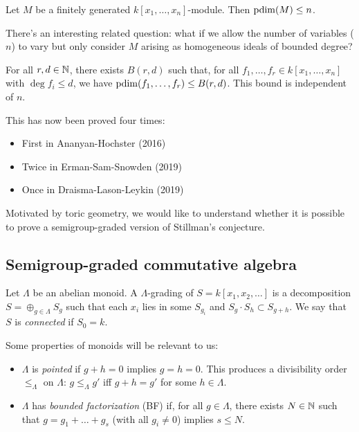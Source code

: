 \documentclass{article}
\begin{document}
\begin{thm}
	Let $M$ be a finitely generated $k[x_1, \dots, x_n]$-module.
	Then $\operatorname{pdim}(M) \leq n$.
\end{thm}

There's an interesting related question: what if we allow the number of variables ($n$) to vary but only consider $M$ arising as homogeneous ideals of bounded degree?

\begin{conj}
	For all $r, d \in \mathbb{N}$, there exists $B(r, d)$ such that, for all $f_1, \dots, f_r \in k[x_1, \dots, x_n]$ with $\deg f_i \leq d$, we have $\operatorname{pdim}(f_1, \dots, f_r) \leq B(r, d)$.
	This bound is independent of $n$.
\end{conj}

This has now been proved four times:
\begin{itemize}
	\item First in Ananyan-Hochster (2016)
	\item Twice in Erman-Sam-Snowden (2019)
	\item Once in Draisma-Lason-Leykin (2019)
\end{itemize}

Motivated by toric geometry, we would like to understand whether it is possible to prove a semigroup-graded version of Stillman's conjecture.

\subsection{Semigroup-graded commutative algebra}

Let $\Lambda$ be an abelian monoid.
A \emph{$\Lambda$}-grading of $S = k[x_1, x_2, \dots]$ is a decomposition $S = \oplus_{g \in \Lambda} S_g$ such that each $x_i$ lies in some $S_{g_i}$ and $S_g \cdot S_h \subset S_{g + h}$.
We say that $S$ is \emph{connected} if $S_0 = k$.

Some properties of monoids will be relevant to us:
\begin{itemize}
	\item $\Lambda$ is \emph{pointed} if $g + h = 0$ implies $g = h = 0$.
		This produces a divisibility order $\leq_\Lambda$ on $\Lambda$: $g \leq_\Lambda g'$ iff $g + h = g'$ for some $h \in \Lambda$.
	\item $\Lambda$ has \emph{bounded factorization} (BF) if, for all $g \in \Lambda$, there exists $N \in \mathbb{N}$ such that $g = g_1 + \dots + g_s$ (with all $g_i \neq 0$) implies $s \leq N$.
\end{itemize}
\end{document}
